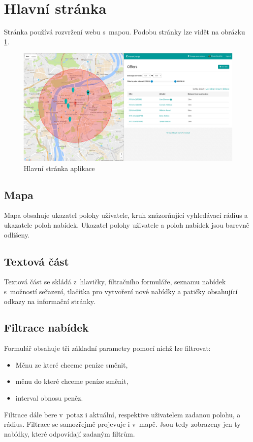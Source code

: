 \section{Hlavní stránka}

\label{nur:homepage}
Stránka používá rozvržení webu s~mapou. Podobu stránky lze vidět na obrázku \ref{fig:tur:homepage}.

\begin{figure}[!h]
    \centering
    \includegraphics[width=1.0\textwidth]{media/tur/homepage.png}
    \caption{Hlavní stránka aplikace}
    \label{fig:tur:homepage}
\end{figure}

\subsection{Mapa}
Mapa obsahuje ukazatel polohy uživatele, kruh znázorňující vyhledávací rádius a ukazatele poloh nabídek. Ukazatel polohy uživatele a poloh nabídek jsou barevně odlišeny.

\subsection{Textová část}
Textová část se skládá z~hlavičky, filtračního formuláře, seznamu nabídek s~možností seřazení, tlačítka pro vytvoření nové nabídky a patičky obsahující odkazy na informační stránky.

\subsection{Filtrace nabídek}
Formulář obsahuje tři základní parametry pomocí nichž lze filtrovat:
\begin{itemize}
	\item Měnu ze které chceme peníze směnit,
	\item měnu do které chceme peníze směnit,
	\item interval obnosu peněz.
\end{itemize}
Filtrace dále bere v~potaz i aktuální, respektive uživatelem zadanou polohu, a rádius. Filtrace se samozřejmě projevuje i v~mapě. Jsou tedy zobrazeny jen ty nabídky, které odpovídají zadaným filtrům.

